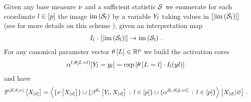 \begin{theorem}
    \label{the:expFamilyTensorRep}
    Given any base measure $\nu$ and a sufficient statistic $\mathcal{S}$ we enumerate for each coordinate $l\in[p]$ the image $\mathrm{im}\left(\mathcal{S}_{l}\right)$ by a variable $Y_{l}$ taking values in $[\left|\mathrm{im}\left(\mathcal{S}_{l}\right)\right|]$ (see for more details on this scheme ), given an interpretation map
    \begin{align*}
        I_{l} :
        [\left|\mathrm{im}\left(\mathcal{S}_{l}\right)\right|] \rightarrow \mathrm{im}\left(\mathcal{S}_{l}\right) \, .
    \end{align*}
    For any canonical parameter vector $\theta\left[L\right]\in\mathbb{R}^{p}$ we build the activation cores
    \begin{align*}
        \alpha^{l,\theta\left[L_{}=l_{}\right]}[Y_{l}=y_{l}]
        = \mathrm{exp}\left[\theta\left[L_{}=l_{}\right] \cdot I_{l}(y{l}) \right] \,
    \end{align*}
    and have
    \begin{align*}
        \mathbb{P}^{(\mathcal{S},\theta,\nu)}\left[X_{[d]}\right] =
        \left\langle \{\nu\left[X_{[d]}\right]\} \cup \{\beta^{\mathcal{S}_{l}}\left[Y_{l},X_{[d]}\right] \, : \, l\in[p]\}\cup\{\alpha^{\mathcal{S}_{l},\theta\left[L_{}=l_{}\right]} \, : \, l\in[p]\}\right\rangle \left[ X_{[d]} | \varnothing \right] \, .
    \end{align*}
\end{theorem}

